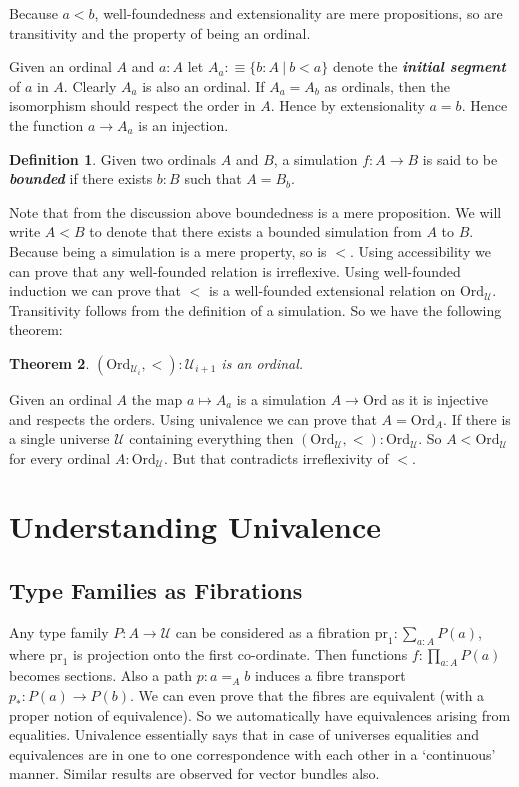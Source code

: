 \documentclass[10pt]{article}
\theoremstyle{definition}
\newtheorem{definition}{Definition}[section]
\theoremstyle{plain}
\newtheorem{theorem}[definition]{Theorem}
\theoremstyle{remark}
\newcommand{\U}{\mathscr{U}}
\begin{document}
Because $a < b$, well-foundedness and extensionality are mere propositions, so are
transitivity and the property of being an ordinal.\smallskip

Given an ordinal $A$ and $a : A$ let $A_a :\equiv \{ b : A\ |\ b < a\}$ denote the 
\textbf{\textit{initial segment}} of $a$ in $A$. Clearly $A_a$ is also an ordinal. If 
$A_a = A_b$ as ordinals, then the isomorphism should respect the order in $A$. Hence by 
extensionality $a = b$. Hence the function $a \to A_a$ is an injection.

\begin{definition}\label{D:Bdd sim}
Given two ordinals $A$ and $B$, a simulation $f : A \to B$ is said to be 
\textbf{\textit{bounded}} if there exists $b : B$ such that $A = B_b$. 
\end{definition}

Note that from the discussion above boundedness is a mere proposition. We will write 
$A < B$ to denote that there exists a bounded simulation from $A$ to $B$. Because being a 
simulation is a mere property, so is $<$. Using accessibility we can prove that any 
well-founded relation is irreflexive. Using well-founded induction we can prove that $<$
is a well-founded extensional relation on $\text{Ord}_{\U}$. Transitivity follows from 
the definition of a simulation. So we have the following theorem:
\begin{theorem}
$(\text{Ord}_{\U_i},<) : \U_{i+1}$ is an ordinal.
\end{theorem}

Given an ordinal $A$ the map $a \mapsto A_a$ is a simulation $A \to \text{Ord}$ as it is 
injective and respects the orders. Using univalence we can prove that $A = \text{Ord}_A$. 
If there is a single universe $\U$ containing everything then 
$(\text{Ord}_{\U},<) : \text{Ord}_{\U}$. So $A < \text{Ord}_{\U}$ for every ordinal 
$A : \text{Ord}_{\U}$. But that contradicts irreflexivity of $<$. 

\section{Understanding Univalence}\label{S:UU}

\subsection{Type Families as Fibrations}
Any type family $P : A \to \U$ can be considered as a fibration 
${ \text{pr}_1 : \sum_{a : A} P(a) }$, where $\text{pr}_1$ is projection onto the first
co-ordinate. Then functions $f : \prod_{a : A} P(a)$ becomes sections. Also a path 
$p : a =_A b$ induces a fibre transport $p_* : P(a) \to P(b)$. We can even prove that the 
fibres are equivalent (with a proper notion of equivalence). So we automatically have 
equivalences arising from equalities. Univalence essentially says that in case of universes
equalities and equivalences are in one to one correspondence with each other in a `continuous'
manner. Similar results are observed for vector bundles also.
\end{document}
